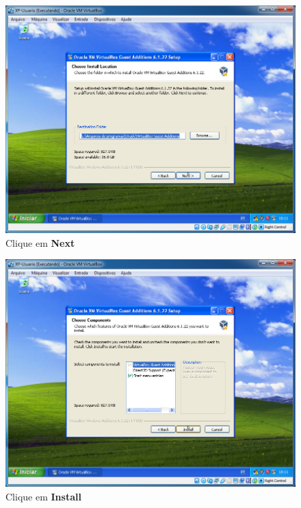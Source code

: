 \documentclass[10pt]{article}
\begin{document}
\begin{figure}[H]
    \centering
    \caption{Clique em \textbf{Next}}
    \label{fig:3117}
    \includegraphics[width=\linewidth]{images/ativacao_das_maquinas_virtuais/configuracao_inicial_das_maquinas_virtuais/017.png}
\end{figure}
\begin{figure}[H]
    \centering
    \caption{Clique em \textbf{Install}}
    \label{fig:3118}
    \includegraphics[width=\linewidth]{images/ativacao_das_maquinas_virtuais/configuracao_inicial_das_maquinas_virtuais/018.png}
\end{figure}
\end{document}
